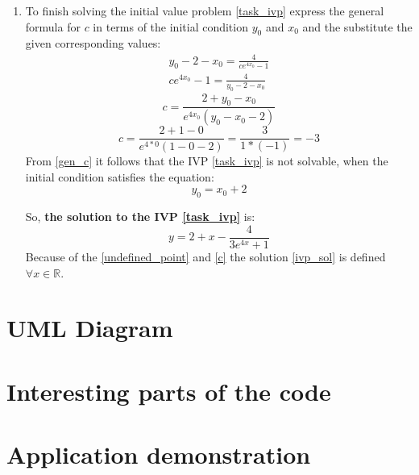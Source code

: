 \documentclass[12pt,a4paper,titlepage,twoside]{article}
\begin{document}
\begin{enumerate}
    \item To finish solving the initial value problem \eqref{task_ivp} express the general formula for $c$ in terms of the initial condition $y_0$ and $x_0$ and the substitute the given corresponding values:
    \begin{gather*}
      y_0 - 2 - x_0 = \frac{4}{ce^{4x_0} - 1} \\
      ce^{4x_0} - 1 = \frac{4}{y_0 - 2 - x_0}
    \end{gather*}
    \begin{equation} \label{gen_c}
      c = \frac{2 + y_0 - x_0}{e^{4x_0}(y_0 - x_0 - 2)}
    \end{equation}
    \begin{equation} \label{c}
      c = \frac{2 + 1 - 0}{e^{4*0}(1 - 0 - 2)} = \frac{3}{1*(-1)} = -3
    \end{equation}
    From \eqref{gen_c} it follows that the IVP \eqref{task_ivp} is not solvable, when the initial condition satisfies the equation:
    \begin{equation}
      y_0 = x_0 + 2
    \end{equation}

    So, \textbf{the solution to the IVP \eqref{task_ivp}} is:
    \begin{equation} \label{ivp_sol}
      y = 2 + x - \frac{4}{3e^{4x} + 1}
    \end{equation}
    Because of the \eqref{undefined_point} and \eqref{c} the solution \eqref{ivp_sol} is defined $\forall x \in \mathbb{R}$.
  \end{enumerate}


  \newpage
  \section{UML Diagram}




  \newpage
  \section{Interesting parts of the code}

  \newpage
  \section{Application demonstration}
\end{document}
